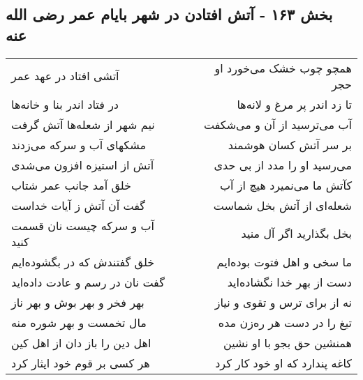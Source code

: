 \begin{center}
\section*{بخش ۱۶۳ - آتش افتادن در شهر بایام عمر رضی الله عنه}
\label{sec:sh163}
\begin{longtable}{l p{0.5cm} r}
آتشی افتاد در عهد عمر
&&
همچو چوب خشک می‌خورد او حجر
\\
در فتاد اندر بنا و خانه‌ها
&&
تا زد اندر پر مرغ و لانه‌ها
\\
نیم شهر از شعله‌ها آتش گرفت
&&
آب می‌ترسید از آن و می‌شکفت
\\
مشکهای آب و سرکه می‌زدند
&&
بر سر آتش کسان هوشمند
\\
آتش از استیزه افزون می‌شدی
&&
می‌رسید او را مدد از بی حدی
\\
خلق آمد جانب عمر شتاب
&&
کآتش ما می‌نمیرد هیچ از آب
\\
گفت آن آتش ز آیات خداست
&&
شعله‌ای از آتش بخل شماست
\\
آب و سرکه چیست نان قسمت کنید
&&
بخل بگذارید اگر آل منید
\\
خلق گفتندش که در بگشوده‌ایم
&&
ما سخی و اهل فتوت بوده‌ایم
\\
گفت نان در رسم و عادت داده‌اید
&&
دست از بهر خدا نگشاده‌اید
\\
بهر فخر و بهر بوش و بهر ناز
&&
نه از برای ترس و تقوی و نیاز
\\
مال تخمست و بهر شوره منه
&&
تیغ را در دست هر ره‌زن مده
\\
اهل دین را باز دان از اهل کین
&&
همنشین حق بجو با او نشین
\\
هر کسی بر قوم خود ایثار کرد
&&
کاغه پندارد که او خود کار کرد
\\
\end{longtable}
\end{center}
